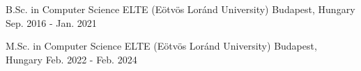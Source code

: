 

\begin{cventries}

  \cventry
    {B.Sc. in Computer Science} %
    {ELTE (Eötvös Loránd University)} %
    {Budapest, Hungary} %
    {Sep. 2016 - Jan. 2021 } %
    {
    }

  \cventry
    {M.Sc. in Computer Science} %
    {ELTE (Eötvös Loránd University)} %
    {Budapest, Hungary} %
    {Feb. 2022 - Feb. 2024} %
    {
    }

\end{cventries}
